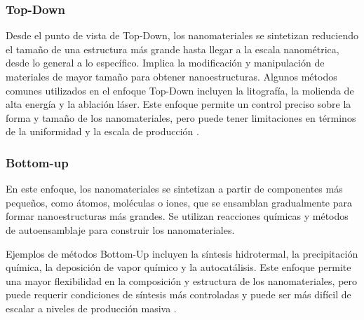 \documentclass[12pt]{article}
\begin{document}
        \subsubsection{Top-Down}
        Desde el punto de vista de Top-Down, los nanomateriales se sintetizan reduciendo el tamaño de una estructura más grande hasta llegar a la escala nanométrica, desde lo general a lo específico. Implica la modificación y manipulación de materiales de mayor tamaño para obtener nanoestructuras. Algunos métodos comunes utilizados en el enfoque Top-Down incluyen la litografía, la molienda de alta energía y la ablación láser. Este enfoque permite un control preciso sobre la forma y tamaño de los nanomateriales, pero puede tener limitaciones en términos de la uniformidad y la escala de producción \cite{IEEEreferencias:TOPDOWN_BOTTOMUP}.
        
        \subsubsection{Bottom-up}
    En este enfoque, los nanomateriales se sintetizan a partir de componentes más pequeños, como átomos, moléculas o iones, que se ensamblan gradualmente para formar nanoestructuras más grandes. Se utilizan reacciones químicas y métodos de autoensamblaje para construir los nanomateriales.\vspace{1em} %
    
    Ejemplos de métodos Bottom-Up incluyen la síntesis hidrotermal, la precipitación química, la deposición de vapor químico y la autocatálisis. Este enfoque permite una mayor flexibilidad en la composición y estructura de los nanomateriales, pero puede requerir condiciones de síntesis más controladas y puede ser más difícil de escalar a niveles de producción masiva \cite{IEEEreferencias:TOPDOWN_BOTTOMUP}.
\vspace{1em} %
    
\end{document}
